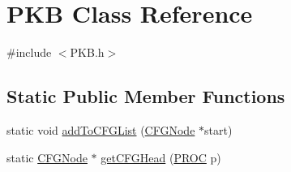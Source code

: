 \hypertarget{class_p_k_b}{\section{P\-K\-B Class Reference}
\label{class_p_k_b}
}


{\ttfamily \#include $<$P\-K\-B.\-h$>$}

\subsection*{Static Public Member Functions}
\begin{DoxyCompactItemize}
\item 
static void \hyperlink{class_p_k_b_a984e5a12e9cc792d0ed5fda9322b9b55}{add\-To\-C\-F\-G\-List} (\hyperlink{class_c_f_g_node}{C\-F\-G\-Node} $\ast$start)
\item 
static \hyperlink{class_c_f_g_node}{C\-F\-G\-Node} $\ast$ \hyperlink{class_p_k_b_a5e3b384d165fbf07bfbab2afb1d9f53a}{get\-C\-F\-G\-Head} (\hyperlink{std_afx_8h_aa07ea1d188c7b45668f1bd82ffd6d87e}{P\-R\-O\-C} p)
\end{DoxyCompactItemize}
